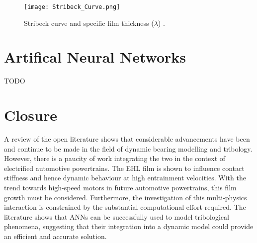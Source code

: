 \begin{figure}
	\centerline{\texttt{[image: Stribeck\_Curve.png]}}
	\caption[Stribeck curve and specific film thickness]{Stribeck curve and specific film thickness ($\lambda$) \cite{Ali2015}.}
	\label{Stribeck_Curve}
\end{figure}

\section{Artifical Neural Networks}

TODO

\section{Closure}
A review of the open literature shows that considerable advancements have been and continue to be made in the field of dynamic bearing modelling and tribology. However, there is a paucity of work integrating the two in the context of electrified automotive powertrains. The EHL film is shown to influence contact stiffness and hence dynamic behaviour at high entrainment velocities. With the trend towards high-speed motors in future automotive powertrains, this film growth must be considered. Furthermore, the investigation of this multi-physics interaction is constrained by the substantial computational effort required. The literature shows that ANNs can be successfully used to model tribological phenomena, suggesting that their integration into a dynamic model could provide an efficient and accurate solution.